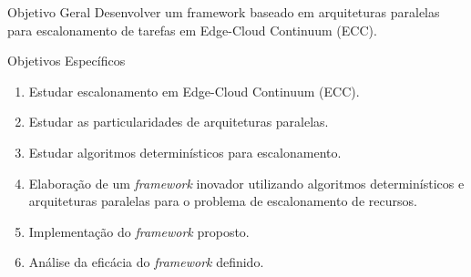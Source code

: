 \begin{frame}{Objetivo Geral}
    Desenvolver um framework baseado em arquiteturas paralelas para
    escalonamento de tarefas em Edge-Cloud Continuum (ECC).
\end{frame}

\begin{frame}{Objetivos Específicos}
    \begin{enumerate}
        \item Estudar escalonamento em Edge-Cloud Continuum (ECC).
        \item Estudar as particularidades de arquiteturas paralelas.
        \item Estudar algoritmos determinísticos para escalonamento.
        \item Elaboração de um \textit{framework} inovador utilizando algoritmos determinísticos e arquiteturas paralelas para o problema de escalonamento de recursos.
        \item Implementação do \textit{framework} proposto.
        \item Análise da eficácia do \textit{framework} definido.
    \end{enumerate}
\end{frame}
